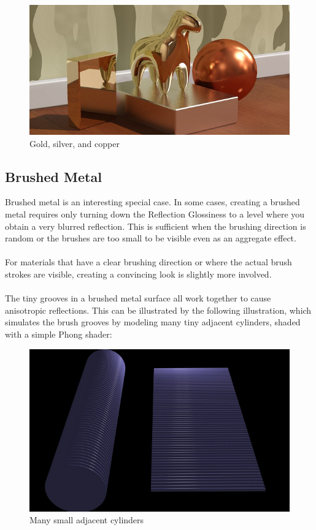 \documentclass[10pt,a4paper]{article}
\begin{document}
\begin{figure}[tbh]
	\centering
	\includegraphics[width=0.5\linewidth]{"figure/Gold, silver, and copper"}
	\caption{Gold, silver, and copper}
	\label{fig:gold-silver-and-copper}
\end{figure}

\subsection{Brushed Metal}
Brushed metal is an interesting special case. In some cases, creating a brushed metal requires only turning down the Reflection Glossiness to a level where you obtain a very blurred reflection. This is sufficient when the brushing direction is random or the brushes are too small to be visible even as an aggregate effect.
\\
\\
For materials that have a clear brushing direction or where the actual brush strokes are visible, creating a convincing look is slightly more involved.
\\
\\
The tiny grooves in a brushed metal surface all work together to cause anisotropic reflections. This can be illustrated by the following illustration, which simulates the brush grooves by modeling many tiny adjacent cylinders, shaded with a simple Phong shader:

\begin{figure}[tbh]
	\centering
	\includegraphics[width=0.5\linewidth]{"figure/Many small adjacent cylinders"}
	\caption{Many small adjacent cylinders}
	\label{fig:many-small-adjacent-cylinders}
\end{figure}
\end{document}
